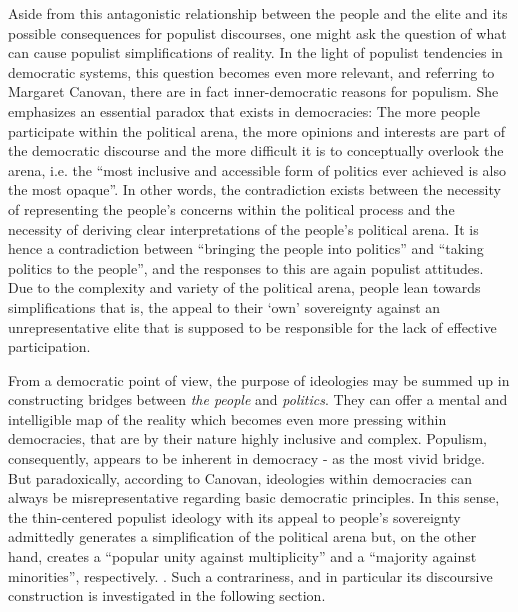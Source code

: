 \documentclass[a4paper]{scrreprt}
\begin{document}
Aside from this antagonistic relationship between the people and the elite and its possible consequences for populist discourses, one might ask the question of what can cause populist simplifications of reality. In the light of populist tendencies in democratic systems, this question becomes even more relevant, and referring to Margaret Canovan, there are in fact inner-democratic reasons for populism. She emphasizes an essential paradox that exists in democracies: The more people participate within the political arena, the more opinions and interests are part of the democratic discourse and the more difficult it is to conceptually overlook the arena, i.e. the ``most inclusive and accessible form of politics ever achieved is also the most opaque''. \cite[p.~25]{canovan:2002} In other words, the contradiction exists between the necessity of representing the people's concerns within the political process and the necessity of deriving clear interpretations of the people's political arena. It is hence a contradiction between ``bringing the people into politics'' and ``taking politics to the people'', and the responses to this are again populist attitudes. \cite[p.~26]{canovan:2002} Due to the complexity and variety of the political arena, people lean towards simplifications that is, the appeal to their `own' sovereignty against an unrepresentative elite that is supposed to be responsible for the lack of effective participation.\par
From a democratic point of view, the purpose of ideologies may be summed up in constructing bridges between {\em the people} and {\em politics}. They can offer a mental and intelligible map of the reality which becomes even more pressing within democracies, that are by their nature highly inclusive and complex. Populism, consequently, appears to be inherent in democracy - as the most vivid bridge. But paradoxically, according to Canovan, ideologies within democracies can always be misrepresentative regarding basic democratic principles. In this sense, the thin-centered populist ideology with its appeal to people’s sovereignty admittedly generates a simplification of the political arena but, on the other hand, creates a ``popular unity against multiplicity'' and a ``majority against minorities'', respectively. \cite[p.~26]{canovan:2002}. Such a contrariness, and in particular its discoursive construction is investigated in the following section.
\end{document}
